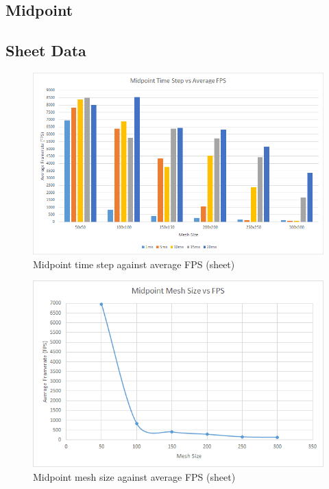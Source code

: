 \begin{landscape}
\section{Midpoint}

\subsection{Sheet Data}

  \begin{figure}[!htb]
    \begin{center}
      \includegraphics{Figures/sheet_m_fps}
    \end{center}
    \caption{Midpoint time step against average FPS (sheet)}
    \label{fig:m fps sheet}
  \end{figure}
\end{landscape}
  
    \begin{figure}
    \begin{center}
      \includegraphics[scale=.9]{Figures/sheet_m_m_fps}
    \end{center}
    \caption{Midpoint mesh size against average FPS (sheet)}
    \label{fig:m mesh fps sheet}
  \end{figure}
  
